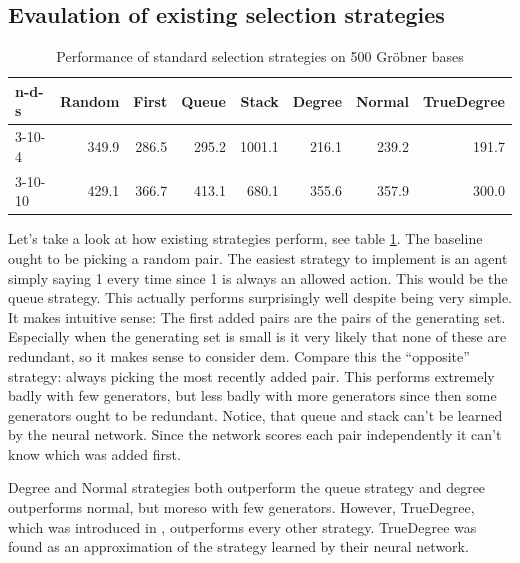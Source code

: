 \documentclass{article}
\theoremstyle{changedot}
\theoremstyle{changedotbreak}
\theoremstyle{nonumberplain}
\begin{document}
\subsection{Evaulation of existing selection strategies}
\begin{table}
  \begin{center}
  \begin{tabular}{lrrrrrrr}
    n-d-s   & Random & First & Queue & Stack  & Degree & Normal & TrueDegree \\ \hline
    3-10-4  & 349.9  & 286.5 & 295.2 & 1001.1 & 216.1  & 239.2  & 191.7 \\
    3-10-10 & 429.1  & 366.7 & 413.1 & 680.1  & 355.6  & 357.9  & 300.0
  \end{tabular}
  \end{center}
  \caption{Performance of standard selection strategies on 500 Gröbner bases}
  \label{tab:std_perf}
\end{table}

Let's take a look at how existing strategies perform, see table \ref{tab:std_perf}. The baseline ought to be picking a random pair. The easiest strategy to implement is an agent simply saying 1 every time since 1 is always an allowed action. This would be the queue strategy. This actually performs surprisingly well despite being very simple. It makes intuitive sense: The first added pairs are the pairs of the generating set. Especially when the generating set is small is it very likely that none of these are redundant, so it makes sense to consider dem. Compare this the ``opposite'' strategy: always picking the most recently added pair. This performs extremely badly with few generators, but less badly with more generators since then some generators ought to be redundant. Notice, that queue and stack can't be learned by the neural network. Since the network scores each pair independently it can't know which was added first.

Degree and Normal strategies both outperform the queue strategy and degree outperforms normal, but moreso with few generators. However, TrueDegree, which was introduced in \cite{peifer}, outperforms every other strategy. TrueDegree was found as an approximation of the strategy learned by their neural network.
\end{document}
